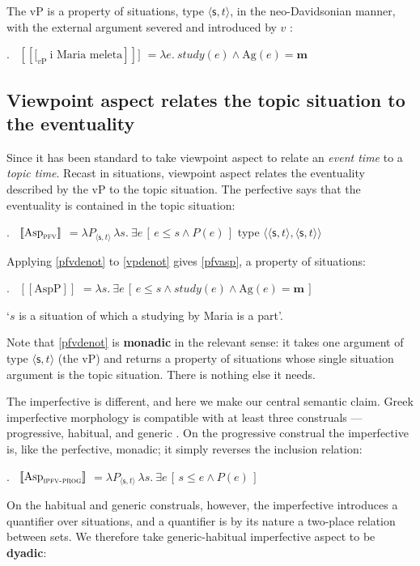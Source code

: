 \documentclass[11pt]{article}
\newcommand{\dbr}[1]{\mbox{ $ [\![ #1 ]\!] $}}
\newcommand{\sit}{\ensuremath{\mathsf{s}}\xspace}
\newcommand{\ty}[1]{\ensuremath{\langle #1 \rangle}}
\begin{document}
The vP is a property of situations, type \ty{\sit,t}, in the neo-Davidsonian manner, with the external argument severed and introduced by $v$ \citep{kratzer:96}:

\ex. \label{vpdenot}
\dbr{\text{[}_{v\mathrm{P}}\ \text{i Maria meleta}]} $= \lambda e.\ \mathit{study}(e) \wedge \mathrm{Ag}(e) = \mathbf{m}$

\subsection{Viewpoint aspect relates the topic situation to the eventuality}\label{aspsem}

Since \citet{Klein94} it has been standard to take viewpoint aspect to relate an \emph{event time} to a \emph{topic time}.  Recast in situations, viewpoint aspect relates the eventuality described by the vP to the topic situation.  The perfective says that the eventuality is contained in the topic situation:

\ex. \label{pfvdenot}
\dbr{\mathrm{Asp}_{\textsc{pfv}}} $= \lambda P_{\ty{\sit,t}}\, \lambda s.\ \exists e\,[\, e \leq s \wedge P(e)\,]$ \hfill type \ty{\ty{\sit,t},\ty{\sit,t}}

Applying \ref{pfvdenot} to \ref{vpdenot} gives \ref{pfvasp}, a property of situations:

\ex. \label{pfvasp}
\dbr{\mathrm{AspP}} $= \lambda s.\ \exists e\,[\, e \leq s \wedge \mathit{study}(e) \wedge \mathrm{Ag}(e) = \mathbf{m}\,]$

\noindent `$s$ is a situation of which a studying by Maria is a part'.

Note that \ref{pfvdenot} is \textbf{monadic} in the relevant sense: it takes one argument of type \ty{\sit,t} (the vP) and returns a property of situations whose single situation argument is the topic situation.  There is nothing else it needs.

The imperfective is different, and here we make our central semantic claim.  Greek imperfective morphology is compatible with at least three construals --- progressive, habitual, and generic \citep{mozer:94, tsimpli-papadopoulou:05, spyropoulos-philippaki:01}.  On the progressive construal the imperfective is, like the perfective, monadic; it simply reverses the inclusion relation:

\ex. \label{progdenot}
\dbr{\mathrm{Asp}_{\textsc{ipfv-prog}}} $= \lambda P_{\ty{\sit,t}}\, \lambda s.\ \exists e\,[\, s \leq e \wedge P(e)\,]$

On the habitual and generic construals, however, the imperfective introduces a quantifier over situations, and a quantifier is by its nature a two-place relation between sets.  We therefore take generic-habitual imperfective aspect to be \textbf{dyadic}:
\end{document}
